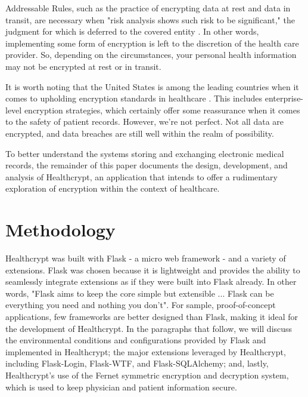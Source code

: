 \documentclass[letterpaper, 10pt,DIV=13]{scrartcl}
\begin{document}
\begin{multicols}{2}
\begin{spacing}{1.25}
Addressable Rules, such as the practice of encrypting data at rest and data in transit, are necessary when "risk analysis shows such risk to be significant," the judgment for which is deferred to the covered entity \cite{hippaprof2017}. In other words, implementing some form of encryption is left to the discretion of the health care provider. So, depending on the circumstances, your personal health information may not be encrypted at rest or in transit.

It is worth noting that the United States is among the leading countries when it comes to upholding encryption standards in healthcare \cite{ponemon2020}. This includes enterprise-level encryption strategies, which certainly offer some reassurance when it comes to the safety of patient records. However, we're not perfect. Not all data are encrypted, and data breaches are still well within the realm of possibility.

To better understand the systems storing and exchanging electronic medical records, the remainder of this paper documents the design, development, and analysis of Healthcrypt, an application that intends to offer a rudimentary exploration of encryption within the context of healthcare.
\end{spacing}

\vspace{-2.5pt}

\section*{Methodology}
\begin{spacing}{1.25}
Healthcrypt was built with Flask - a micro web framework - and a variety of extensions. Flask was chosen because it is lightweight and provides the ability to seamlessly integrate extensions as if they were built into Flask already. In other words, "Flask aims to keep the core simple but extensible ... Flask can be everything you need and nothing you don’t"\cite{FlaskDocs}. For sample, proof-of-concept applications, few frameworks are better designed than Flask, making it ideal for the development of Healthcrypt. In the paragraphs that follow, we will discuss the environmental conditions and configurations provided by Flask and implemented in Healthcrypt; the major extensions leveraged by Healthcrypt, including Flask-Login, Flask-WTF, and Flask-SQLAlchemy; and, lastly, Healthcrypt's use of the Fernet symmetric encryption and decryption system, which is used to keep physician and patient information secure.


\end{spacing}
\end{multicols}
\end{document}
